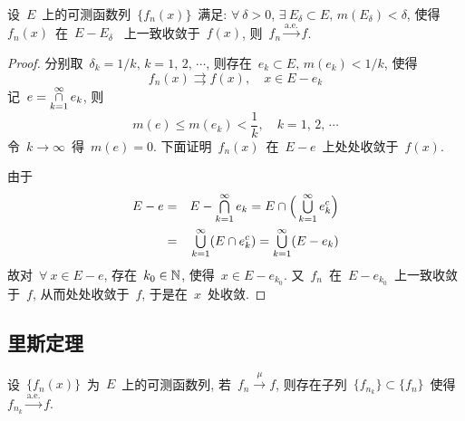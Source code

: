 \begin{theorem}
设~$E$~上的可测函数列~$\{f_n(x)\}$~满足: $\forall~\delta > 0$, $\exists~E_\delta \subset E, \, m(E_\delta) < \delta$, 使得~$f_n(x)$~在~$E-E_\delta$~
上一致收敛于~$f(x)$, 则~$f_n \xrightarrow{\mathrm{a.e.}} f$.
\end{theorem}

\begin{proof}
分别取~$\delta_k = 1/k, \, k = 1,\,2,\, \cdots$, 则存在~$e_k \subset E, \, m(e_k) < 1/k$, 使得
\[
f_n(x) \rightrightarrows f(x), \quad x \in E - e_k
\]
记~$e = \mathop{\cap}\limits_{k=1}^\infty e_k$, 则
\[
m(e) \leqslant m(e_k) < \frac{1}{k}, \quad k = 1, \, 2, \, \cdots
\]
令~$k \to \infty$~得~$m(e) = 0$. 下面证明~$f_n(x)$~在~$E - e$~上处处收敛于~$f(x)$.

由于
\begin{eqnarray*}
E -e &=& E - \mathop{\textstyle{\bigcap}}\limits_{k=1}^\infty e_k = E \cap \Big( \mathop{\textstyle{\bigcup}}\limits_{k=1}^\infty e^c_k \Big) \\
&=& \mathop{\textstyle{\bigcup}}\limits_{k=1}^\infty (E \cap e^c_k) = \mathop{\textstyle{\bigcup}}\limits_{k=1}^\infty (E - e_k)
\end{eqnarray*}
故对~$\forall~x \in E - e$, 存在~$k_0 \in \mathbb{N}$, 使得~$x \in E - e_{k_0}$. 又~$f_n$~在~$E - e_{k_0}$~上一致收敛于~$f$, 从而处处收敛于~$f$, 于是在~$x$~处收敛.
\end{proof}

\subsection{里斯定理}

\begin{theorem} \label{Rieszth}
设~$\{f_n(x)\}$~为~$E$~上的可测函数列, 若~$f_n \xrightarrow{~\mu~} f$, 则存在子列~$\{f_{n_k}\} \subset \{f_n\}$~使得~$f_{n_k} \xrightarrow{\mathrm{a.e.}} f$.
\end{theorem}

